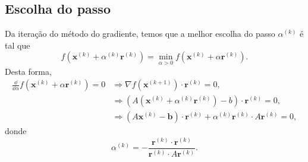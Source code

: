 \begin{ex}
% 
\end{ex}

\subsection{Escolha do passo}

Da iteração do método do gradiente, temos que a melhor escolha do passo $\alpha^{(k)}$ é tal que
\begin{equation}
  f(\pmb{x}^{(k)}+\alpha^{(k)}\pmb{r}^{(k)}) = \min_{\alpha > 0} f(\pmb{x}^{(k)}+\alpha\pmb{r}^{(k)}).
\end{equation}
Desta forma,
\begin{align}
  \frac{\dd}{\dd \alpha}f(\pmb{x}^{(k)}+\alpha \pmb{r}^{(k)}) = 0 &\Rightarrow \nabla f(\pmb{x}^{(k+1)})\cdot \pmb{r}^{(k)} = 0,\\
  &\Rightarrow \left(A(\pmb{x}^{(k)}+\alpha^{(k)}\pmb{r}^{(k)})-b\right)\cdot\pmb{r}^{(k)} = 0,\\
  &\Rightarrow (A\pmb{x}^{(k)}-\pmb{b})\cdot\pmb{r}^{(k)}+\alpha^{(k)}\pmb{r}^{(k)}\cdot A\pmb{r}^{(k)} = 0,
\end{align}
donde
\begin{equation}
  \alpha^{(k)} = - \frac{\pmb{r}^{(k)}\cdot\pmb{r}^{(k)}}{\pmb{r}^{(k)}\cdot A\pmb{r}^{(k)}}.
\end{equation}

